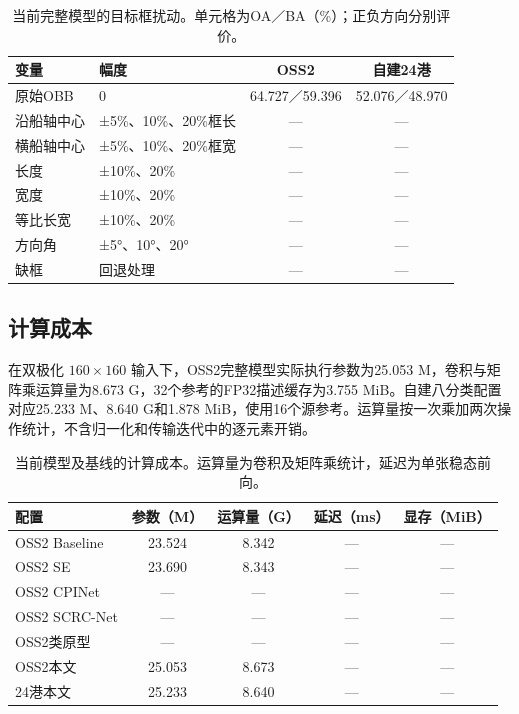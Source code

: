 \documentclass[journal,10pt,a4paper]{IEEEtran}
\begin{document}
\begin{table}[H]
\centering\footnotesize
\setcounter{table}{15}
\caption{当前完整模型的目标框扰动。单元格为OA／BA（\%）；正负方向分别评价。}
\label{tab:16}
\setlength{\tabcolsep}{3pt}\renewcommand{\arraystretch}{1.2}
\begin{tabularx}{\linewidth}{LLCC}
\toprule
变量 & 幅度 & OSS2 & 自建24港 \\
\midrule
原始OBB & 0 & 64.727／59.396 & 52.076／48.970 \\
沿船轴中心 & ±5\%、10\%、20\%框长 & --- & --- \\
横船轴中心 & ±5\%、10\%、20\%框宽 & --- & --- \\
长度 & ±10\%、20\% & --- & --- \\
宽度 & ±10\%、20\% & --- & --- \\
等比长宽 & ±10\%、20\% & --- & --- \\
方向角 & ±5°、10°、20° & --- & --- \\
缺框 & 回退处理 & --- & --- \\
\bottomrule
\end{tabularx}
\end{table}

\subsection{计算成本}\label{ux8ba1ux7b97ux6210ux672c}

在双极化 \(160\times160\) 输入下，OSS2完整模型实际执行参数为25.053 M，卷积与矩阵乘运算量为8.673 G，32个参考的FP32描述缓存为3.755 MiB。自建八分类配置对应25.233 M、8.640 G和1.878 MiB，使用16个源参考。运算量按一次乘加两次操作统计，不含归一化和传输迭代中的逐元素开销。

\begin{table}[H]
\centering\footnotesize
\setcounter{table}{16}
\caption{当前模型及基线的计算成本。运算量为卷积及矩阵乘统计，延迟为单张稳态前向。}
\label{tab:17}
\setlength{\tabcolsep}{3pt}\renewcommand{\arraystretch}{1.2}
\begin{tabularx}{\linewidth}{LCCCC}
\toprule
配置 & 参数（M） & 运算量（G） & 延迟（ms） & 显存（MiB） \\
\midrule
OSS2 Baseline & 23.524 & 8.342 & --- & --- \\
OSS2 SE & 23.690 & 8.343 & --- & --- \\
OSS2 CPINet & --- & --- & --- & --- \\
OSS2 SCRC-Net & --- & --- & --- & --- \\
OSS2类原型 & --- & --- & --- & --- \\
OSS2本文 & 25.053 & 8.673 & --- & --- \\
24港本文 & 25.233 & 8.640 & --- & --- \\
\bottomrule
\end{tabularx}
\end{table}
\end{document}
